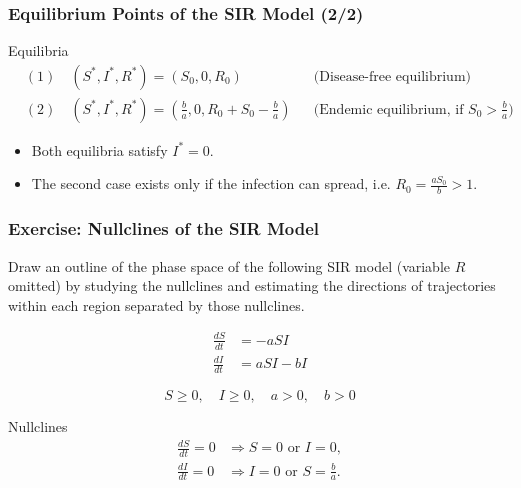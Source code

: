 \documentclass{beamer}
\begin{document}
\begin{frame}
\frametitle{Equilibrium Points of the SIR Model (2/2)}
\small
\begin{block}{Equilibria}
\[
\begin{aligned}
&(1)\quad (S^*, I^*, R^*) = (S_0, 0, R_0) 
&&\text{(Disease-free equilibrium)} \\[4pt]
&(2)\quad (S^*, I^*, R^*) = \left(\frac{b}{a}, 0, R_0 + S_0 - \frac{b}{a}\right)
&&\text{(Endemic equilibrium, if } S_0 > \tfrac{b}{a})
\end{aligned}
\]
\end{block}

\begin{itemize}
\item Both equilibria satisfy $I^* = 0$.
\item The second case exists only if the infection can spread, i.e. $R_0 = \frac{aS_0}{b} > 1$.
\end{itemize}
\end{frame}


\begin{frame}
\frametitle{Exercise: Nullclines of the SIR Model}

\tiny
\begin{block}{}
Draw an outline of the phase space of the following SIR model
(variable \( R \) omitted) by studying the nullclines and estimating the directions
of trajectories within each region separated by those nullclines.
\end{block}

\[
\begin{aligned}
\frac{dS}{dt} &= -aSI \\
\frac{dI}{dt} &= aSI - bI
\end{aligned}
\]

\[
S \ge 0, \quad I \ge 0, \quad a>0, \quad b>0
\]

\begin{block}{Nullclines}
\[
\begin{aligned}
\frac{dS}{dt} = 0 &\Rightarrow S=0 \text{ or } I=0, \\
\frac{dI}{dt} = 0 &\Rightarrow I=0 \text{ or } S = \frac{b}{a}.
\end{aligned}
\]
\end{block}

\end{frame}
\end{document}
